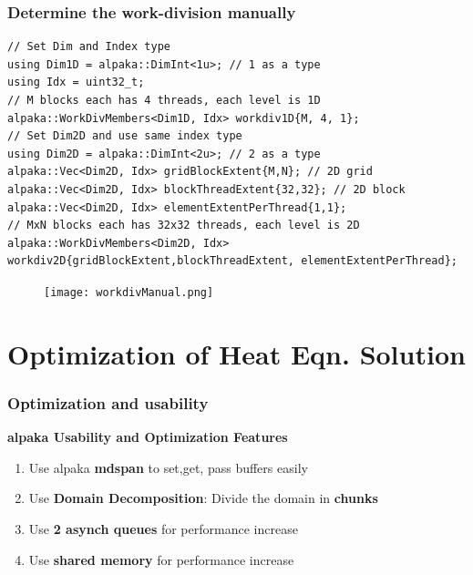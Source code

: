 \documentclass[9pt]{beamer}
\begin{document}
\begin{frame}[fragile]
\frametitle{Determine the work-division manually}
\begin{lstlisting}
// Set Dim and Index type
using Dim1D = alpaka::DimInt<1u>; // 1 as a type
using Idx = uint32_t;
// M blocks each has 4 threads, each level is 1D
alpaka::WorkDivMembers<Dim1D, Idx> workdiv1D{M, 4, 1};
// Set Dim2D and use same index type
using Dim2D = alpaka::DimInt<2u>; // 2 as a type
alpaka::Vec<Dim2D, Idx> gridBlockExtent{M,N}; // 2D grid
alpaka::Vec<Dim2D, Idx> blockThreadExtent{32,32}; // 2D block
alpaka::Vec<Dim2D, Idx> elementExtentPerThread{1,1};
// MxN blocks each has 32x32 threads, each level is 2D
alpaka::WorkDivMembers<Dim2D, Idx> workdiv2D{gridBlockExtent,blockThreadExtent, elementExtentPerThread};
\end{lstlisting}
\begin{figure}
    \centering
    \texttt{[image: workdivManual.png]}
\end{figure}

\end{frame}

\section{Optimization of Heat Eqn. Solution}

\begin{frame}
\frametitle{Optimization and usability}
\begin{center}
      \Huge \textbf{alpaka Usability and Optimization Features}
  \end{center}
\begin{enumerate}
 \item Use alpaka \textbf{mdspan} to set,get, pass buffers easily
 \item Use \textbf{Domain Decomposition}: Divide the domain in \textbf{chunks}
 \item Use \textbf{2 asynch queues} for performance increase
 \item Use \textbf{shared memory} for performance increase
\end{enumerate}
    \end{frame}
\end{document}

